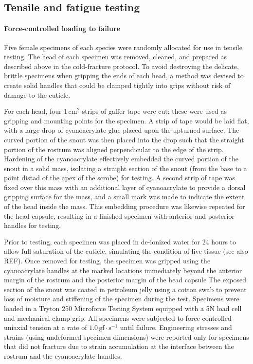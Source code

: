 \documentclass[twocolumn, linenumbers, superscriptaddress, nofootinbib]{revtex4-1}
\begin{document}
		\subsection*{Tensile and fatigue testing}
			\paragraph*{Force-controlled loading to failure}
				Five female specimens of each species were randomly allocated for use in tensile testing.
				The head of each specimen was removed, cleaned, and prepared as described above in the cold-fracture protocol.
				To avoid destroying the delicate, brittle specimens when gripping the ends of each head, a method was devised to create solid handles that could be clamped tightly into grips without risk of damage to the cuticle.
				
				For each head, four $1\,\text{cm}^2$ strips of gaffer tape were cut; these were used as gripping and mounting points for the specimen.
				A strip of tape would be laid flat, with a large drop of cyanoacrylate glue placed upon the upturned surface.
				The curved portion of the snout was then placed into the drop such that the straight portion of the rostrum was aligned perpendicular to the edge of the strip.
				Hardening of the cyanoacrylate effectively embedded the curved portion of the snout in a solid mass, isolating a straight section of the snout (from the base to a point distad of the apex of the scrobe) for testing.
				A second strip of tape was fixed over this mass with an additional layer of cyanoacrylate to provide a dorsal gripping surface for the mass, and a small mark was made to indicate the extent of the head inside the mass.
				This embedding procedure was likewise repeated for the head capsule, resulting in a finished specimen with anterior and posterior handles for testing.
				
				Prior to testing, each specimen was placed in de-ionized water for 24 hours to allow full saturation of the cuticle, simulating the condition of live tissue (see also REF).
				Once removed for testing, the specimen was gripped using the cyanoacrylate handles at the marked locations immediately beyond the anterior margin of the rostrum and the posterior margin of the head capsule
				The exposed section of the snout was coated in petroleum jelly using a cotton swab to prevent loss of moisture and stiffening of the specimen during the test.
				Specimens were loaded in a Tryton 250 Microforce Testing System equipped with a 5N load cell and mechanical clamp grip.
				All specimens were subjected to force-controlled uniaxial tension at a rate of $1.0\,\text{gf}\cdot\text{s}^{-1}$ until failure.
				Engineering stresses and strains (using undeformed specimen dimensions) were reported only for specimens that did not fracture due to strain accumulation at the interface between the rostrum and the cyanoacrylate handles.
				
\end{document}
